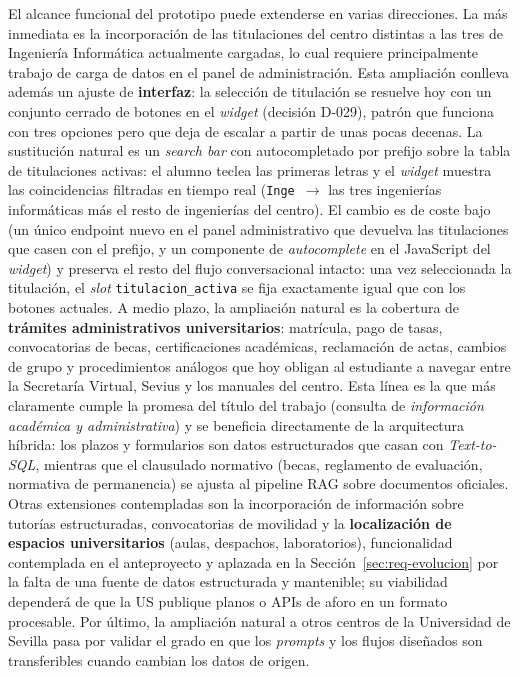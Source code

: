 El alcance funcional del prototipo puede extenderse en varias direcciones. La más inmediata es la incorporación de las titulaciones del centro distintas a las tres de Ingeniería Informática actualmente cargadas, lo cual requiere principalmente trabajo de carga de datos en el panel de administración. Esta ampliación conlleva además un ajuste de \textbf{interfaz}: la selección de titulación se resuelve hoy con un conjunto cerrado de botones en el \textit{widget} (decisión D-029), patrón que funciona con tres opciones pero que deja de escalar a partir de unas pocas decenas. La sustitución natural es un \textit{search bar} con autocompletado por prefijo sobre la tabla de titulaciones activas: el alumno teclea las primeras letras y el \textit{widget} muestra las coincidencias filtradas en tiempo real (\texttt{Inge}~$\rightarrow$ las tres ingenierías informáticas más el resto de ingenierías del centro). El cambio es de coste bajo (un único endpoint nuevo en el panel administrativo que devuelva las titulaciones que casen con el prefijo, y un componente de \textit{autocomplete} en el JavaScript del \textit{widget}) y preserva el resto del flujo conversacional intacto: una vez seleccionada la titulación, el \textit{slot} \texttt{titulacion\_activa} se fija exactamente igual que con los botones actuales. A medio plazo, la ampliación natural es la cobertura de \textbf{trámites administrativos universitarios}: matrícula, pago de tasas, convocatorias de becas, certificaciones académicas, reclamación de actas, cambios de grupo y procedimientos análogos que hoy obligan al estudiante a navegar entre la Secretaría Virtual, Sevius y los manuales del centro. Esta línea es la que más claramente cumple la promesa del título del trabajo (consulta de \textit{información académica y administrativa}) y se beneficia directamente de la arquitectura híbrida: los plazos y formularios son datos estructurados que casan con \textit{Text-to-SQL}, mientras que el clausulado normativo (becas, reglamento de evaluación, normativa de permanencia) se ajusta al pipeline RAG sobre documentos oficiales. Otras extensiones contempladas son la incorporación de información sobre tutorías estructuradas, convocatorias de movilidad y la \textbf{localización de espacios universitarios} (aulas, despachos, laboratorios), funcionalidad contemplada en el anteproyecto y aplazada en la Sección~\ref{sec:req-evolucion} por la falta de una fuente de datos estructurada y mantenible; su viabilidad dependerá de que la US publique planos o APIs de aforo en un formato procesable. Por último, la ampliación natural a otros centros de la Universidad de Sevilla pasa por validar el grado en que los \textit{prompts} y los flujos diseñados son transferibles cuando cambian los datos de origen.

